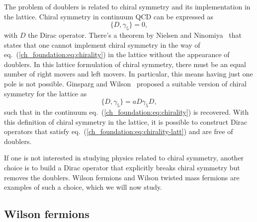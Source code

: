 The problem of doublers is related to chiral symmetry and its implementation in the lattice. Chiral symmetry in continuum QCD can be expressed as 
\begin{equation}
\label{ch_foundation:eq:chirality}
\{D,\gamma_5\}=0,
\end{equation}
with $D$ the Dirac operator. There's a theorem by Nielsen and Ninomiya~\citep{Nielsen:1980rz,Nielsen:1981hk} that states that one cannot implement chiral symmetry in the way of eq.~(\ref{ch_foundation:eq:chirality}) in the lattice without the appearance of doublers. In this lattice formulation of chiral symmetry, there must be an equal number of right movers and left movers. In particular, this means having just one pole is not possible. Ginsparg and Wilson~\citep{Ginsparg:1981bj} proposed a suitable version of chiral symmetry for the lattice as
\begin{equation}
\label{ch_foundation:eq:chirality-latt}
\{D,\gamma_5\}=aD\gamma_5D,
\end{equation}
such that in the continuum eq.~(\ref{ch_foundation:eq:chirality}) is recovered. With this definition of chiral symmetry in the lattice, it is possible to construct Dirac operators that satisfy eq.~(\ref{ch_foundation:eq:chirality-latt}) and are free of doublers. 

If one is not interested in studying physics related to chiral symmetry, another choice is to build a Dirac operator that explicitly breaks chiral symmetry but removes the doublers. Wilson fermions and Wilson twisted mass fermions are examples of such a choice, which we will now study.


\subsection{Wilson fermions}
\label{ch_foundation:subsec:Wilson}

